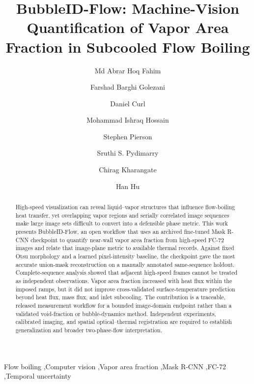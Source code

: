 \documentclass[preprint,12pt,sort&compress]{elsarticle}
\begin{document}
\begin{frontmatter}

\title{BubbleID-Flow: Machine-Vision Quantification of Vapor Area Fraction in Subcooled Flow Boiling}

\author[uark]{Md Abrar Hoq Fahim}
\author[cwru]{Farshad Barghi Golezani}
\author[uark]{Daniel Curl}
\author[uark]{Mohammad Ishraq Hossain}
\author[uark]{Stephen Pierson}
\author[cwru]{Sruthi S. Pydimarry}
\author[cwru]{Chirag Kharangate}
\author[uark]{Han Hu}

\address[uark]{Department of Mechanical Engineering, University of Arkansas, Fayetteville, AR, USA}
\address[cwru]{Department of Mechanical and Aerospace Engineering, Case Western Reserve University, Cleveland, OH, USA}

\begin{abstract}
High-speed visualization can reveal liquid--vapor structures that influence flow-boiling heat transfer, yet overlapping vapor regions and serially correlated image sequences make large image sets difficult to convert into a defensible phase metric. This work presents BubbleID-Flow, an open workflow that uses an archived fine-tuned Mask R-CNN checkpoint to quantify near-wall vapor area fraction from high-speed FC-72 images and relate that image-plane metric to available thermal records. Against fixed Otsu morphology and a learned pixel-intensity baseline, the checkpoint gave the most accurate union-mask reconstruction on a manually annotated same-sequence holdout. Complete-sequence analysis showed that adjacent high-speed frames cannot be treated as independent observations. Vapor area fraction increased with heat flux within the imposed ramps, but it did not improve cross-validated surface-temperature prediction beyond heat flux, mass flux, and inlet subcooling. The contribution is a traceable, released measurement workflow for a bounded image-domain endpoint rather than a validated void-fraction or bubble-dynamics method. Independent experiments, calibrated imaging, and spatial optical--thermal registration are required to establish generalization and broader two-phase-flow interpretation.
\end{abstract}

\begin{keyword}
Flow boiling \sep Computer vision \sep Vapor area fraction \sep Mask R-CNN \sep FC-72 \sep Temporal uncertainty
\end{keyword}

\end{frontmatter}
\end{document}
